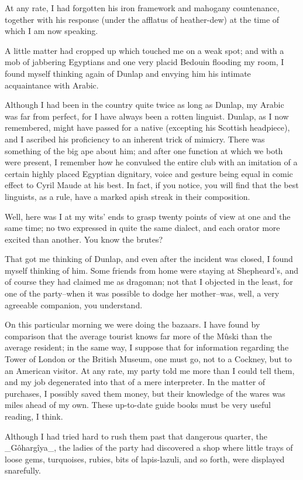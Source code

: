 At any rate, I had forgotten his iron framework and mahogany
countenance, together with his response (under the afflatus of
heather-dew) at the time of which I am now speaking.

A little matter had cropped up which touched me on a weak spot; and
with a mob of jabbering Egyptians and one very placid Bedouin flooding
my room, I found myself thinking again of Dunlap and envying him his
intimate acquaintance with Arabic.

Although I had been in the country quite twice as long as Dunlap, my
Arabic was far from perfect, for I have always been a rotten linguist.
Dunlap, as I now remembered, might have passed for a native (excepting
his Scottish headpiece), and I ascribed his proficiency to an inherent
trick of mimicry. There was something of the big ape about him; and
after one function at which we both were present, I remember how he
convulsed the entire club with an imitation of a certain highly placed
Egyptian dignitary, voice and gesture being equal in comic effect to
Cyril Maude at his best. In fact, if you notice, you will find that
the best linguists, as a rule, have a marked apish streak in their
composition.

Well, here was I at my wits' ends to grasp twenty points of view at
one and the same time; no two expressed in quite the same dialect,
and each orator more excited than another. You know the brutes?

That got me thinking of Dunlap, and even after the incident was
closed, I found myself thinking of him. Some friends from home were
staying at Shepheard's, and of course they had claimed me as dragoman;
not that I objected in the least, for one of the party--when it was
possible to dodge her mother--was, well, a very agreeable companion,
you understand.

On this particular morning we were doing the bazaars. I have found by
comparison that the average tourist knows far more of the Mûski than
the average resident; in the same way, I suppose that for information
regarding the Tower of London or the British Museum, one must go, not
to a Cockney, but to an American visitor. At any rate, my party told
me more than I could tell them, and my job degenerated into that of
a mere interpreter. In the matter of purchases, I possibly saved them
money, but their knowledge of the wares was miles ahead of my own.
These up-to-date guide books must be very useful reading, I think.

Although I had tried hard to rush them past that dangerous quarter,
the _Gôhargîya_, the ladies of the party had discovered a shop where
little trays of loose gems, turquoises, rubies, bits of lapis-lazuli,
and so forth, were displayed snarefully.

